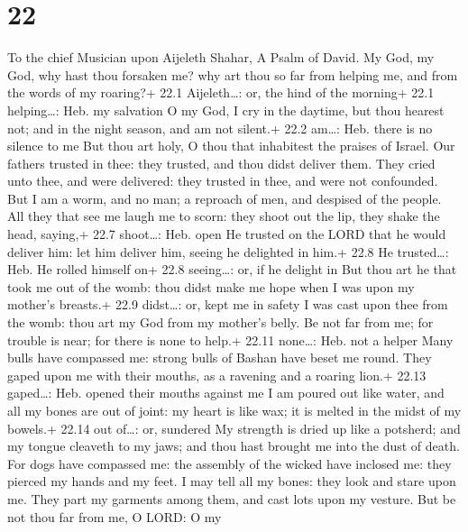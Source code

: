 \hypertarget{section-21}{%
\section{22}\label{section-21}}

To the chief Musician upon Aijeleth Shahar, A Psalm of David.
 My God, my God, why hast thou forsaken me? why art thou so
far from helping me, and from the words of my roaring?+ 22.1
Aijeleth\ldots: or, the hind of the morning+ 22.1 helping\ldots: Heb. my
salvation  O my God, I cry in the daytime, but thou hearest
not; and in the night season, and am not silent.+ 22.2 am\ldots: Heb.
there is no silence to me  But thou art holy, O thou that
inhabitest the praises of Israel.  Our fathers trusted in
thee: they trusted, and thou didst deliver them.  They cried
unto thee, and were delivered: they trusted in thee, and were not
confounded.  But I am a worm, and no man; a reproach of men,
and despised of the people.  All they that see me laugh me
to scorn: they shoot out the lip, they shake the head, saying,+ 22.7
shoot\ldots: Heb. open  He trusted on the LORD that he would
deliver him: let him deliver him, seeing he delighted in him.+ 22.8 He
trusted\ldots: Heb. He rolled himself on+ 22.8 seeing\ldots: or, if he
delight in  But thou art he that took me out of the womb:
thou didst make me hope when I was upon my mother's breasts.+ 22.9
didst\ldots: or, kept me in safety  I was cast upon thee
from the womb: thou art my God from my mother's belly.  Be
not far from me; for trouble is near; for there is none to help.+ 22.11
none\ldots: Heb. not a helper  Many bulls have compassed
me: strong bulls of Bashan have beset me round.  They gaped
upon me with their mouths, as a ravening and a roaring lion.+ 22.13
gaped\ldots: Heb. opened their mouths against me  I am
poured out like water, and all my bones are out of joint: my heart is
like wax; it is melted in the midst of my bowels.+ 22.14 out of\ldots:
or, sundered  My strength is dried up like a potsherd; and
my tongue cleaveth to my jaws; and thou hast brought me into the dust of
death.  For dogs have compassed me: the assembly of the
wicked have inclosed me: they pierced my hands and my feet.
 I may tell all my bones: they look and stare upon me.
 They part my garments among them, and cast lots upon my
vesture.  But be not thou far from me, O LORD: O my

